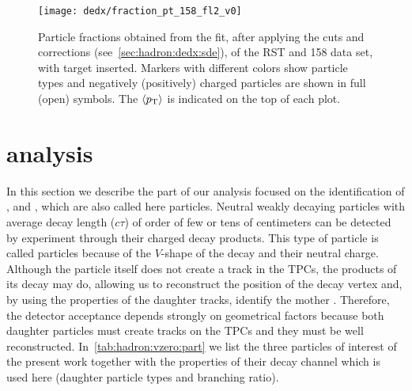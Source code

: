 \begin{figure}
  \centering
  \texttt{[image: dedx/fraction\_pt\_158\_fl2\_v0]}
  \caption{Particle fractions obtained from the \dedx fit,
    after applying the cuts and corrections (see~\cref{sec:hadron:dedx:sde}),
    of the RST and 158 \GeVc data set, with target inserted. Markers with different
    colors show particle types and negatively (positively) charged particles are shown
    in full (open) symbols. The $\langle p_\text{T}\rangle$ is indicated on the top of each plot.}
  \label{fig:hadron:dedx:fit:final158r}
\end{figure}

\clearpage

\section[\vzero analysis]{\boldmath \vzero analysis}
\label{sec:hadron:vzero}

In this section we describe the part of our analysis
focused on the identification of \lamb, \antilamb and \kzeros,
which are also called here \vzero particles.
Neutral weakly decaying particles with average decay length ($c\tau$)
of order of few or tens of centimeters can be detected by \NASixtyOne
experiment through their charged decay products. This type of
particle is called \vzero particles because of the $V$-shape of
the decay and their neutral charge. Although the \vzero
particle itself does not create a track in the TPCs, the products
of its decay may do, allowing us to reconstruct the position of the
decay vertex and, by using the properties of the daughter tracks,
identify the mother \vzero. Therefore, the detector acceptance
depends strongly on geometrical factors because both daughter particles
must create tracks on the TPCs and they must be well reconstructed. 
In~\cref{tab:hadron:vzero:part} we list the three \vzero particles of interest
of the present work together with the properties of their decay channel
which is used here (daughter particle types and branching ratio). 

